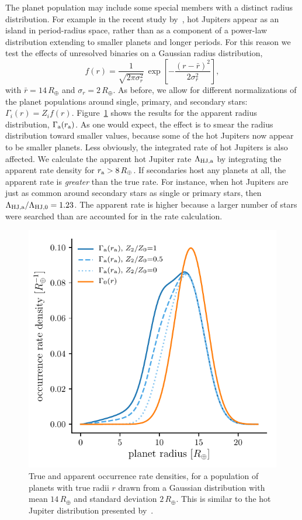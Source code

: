 \documentclass[12pt,modern,trackchanges]{aastex61}
\renewcommand{\a}{_{\rm a}}
\begin{document}
The planet population may include some special members with a distinct
radius distribution.  For example in the recent study
by~\citet{petigura_CKS_2017}, hot Jupiters appear as an island in
period-radius space, rather than as a component of a power-law
distribution extending to smaller planets and longer periods.  For
this reason we test the effects of unresolved binaries on a Gaussian
radius distribution,
\begin{equation}
    f(r) = 
    \frac{1}{\sqrt{2 \pi \sigma_r^2}} \,
    \exp \left[ -\frac{(r-\bar{r})^2}{2\sigma_r^2} \right],
\end{equation}
with $\bar{r} = 14\,R_\oplus$ and $\sigma_r = 2\,R_\oplus$.  As before,
we allow for different normalizations of the planet populations around
single, primary, and secondary stars: $\Gamma_i(r) = Z_i f(r)$.
Figure~\ref{fig:gaussian_HJ} shows the results for the apparent radius
distribution, $\Gamma\a(r\a)$.  As one would expect, the effect is to
smear the radius distribution toward smaller values, because some of
the hot Jupiters now appear to be smaller planets.  Less obviously,
the integrated rate of hot Jupiters is also affected.  We calculate
the apparent hot Jupiter rate $\Lambda_{\rm HJ,a}$ by integrating the
apparent rate density for $r\a > 8\,R_\oplus$.  If secondaries host
any planets at all, the apparent rate is {\it greater} than the true
rate.  For instance, when hot Jupiters are just as common around
secondary stars as single or primary stars, then $\Lambda_{\rm
HJ,a}/\Lambda_{{\rm HJ},0} = 1.23$.
The apparent rate is higher because a larger number of stars were
searched than are accounted for in the rate calculation.

\begin{figure}[!tb]
    \centering
    \includegraphics[width=.6\textwidth]{f7.pdf}
    \caption{ True and apparent occurrence rate densities, for a
    population of planets with true radii $r$ drawn from a Gaussian
    distribution with mean $14\,R_\oplus$ and standard deviation
    $2\,R_\oplus$.  This is similar to the hot Jupiter distribution
    presented by~\citet{petigura_CKS_2017}.  }
    \label{fig:gaussian_HJ}
\end{figure}
\end{document}
